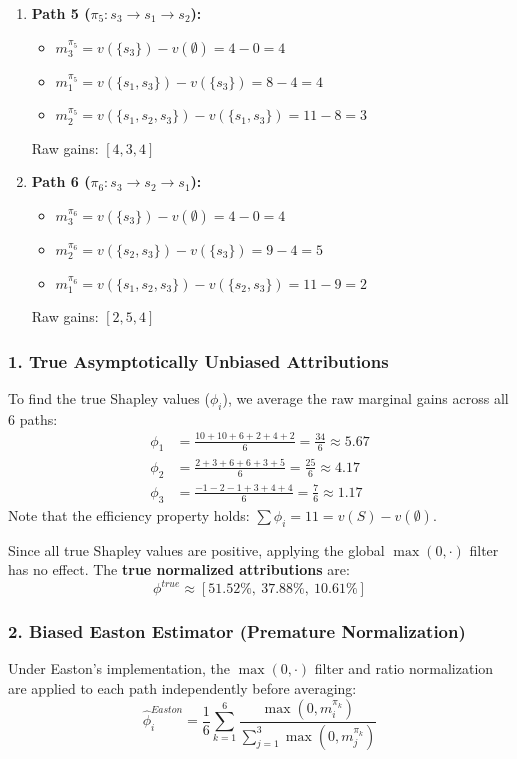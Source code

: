 \documentclass{article}
\begin{document}
\begin{enumerate}
    \item \textbf{Path 5 ($\pi_5: s_3 \to s_1 \to s_2$):} 
    \begin{itemize}
        \item $m_3^{\pi_5} = v(\{s_3\}) - v(\emptyset) = 4 - 0 = 4$
        \item $m_1^{\pi_5} = v(\{s_1, s_3\}) - v(\{s_3\}) = 8 - 4 = 4$
        \item $m_2^{\pi_5} = v(\{s_1, s_2, s_3\}) - v(\{s_1, s_3\}) = 11 - 8 = 3$
    \end{itemize}
    Raw gains: $[4, 3, 4]$

    \item \textbf{Path 6 ($\pi_6: s_3 \to s_2 \to s_1$):} 
    \begin{itemize}
        \item $m_3^{\pi_6} = v(\{s_3\}) - v(\emptyset) = 4 - 0 = 4$
        \item $m_2^{\pi_6} = v(\{s_2, s_3\}) - v(\{s_3\}) = 9 - 4 = 5$
        \item $m_1^{\pi_6} = v(\{s_1, s_2, s_3\}) - v(\{s_2, s_3\}) = 11 - 9 = 2$
    \end{itemize}
    Raw gains: $[2, 5, 4]$
\end{enumerate}

\subsubsection{1. True Asymptotically Unbiased Attributions}
To find the true Shapley values ($\phi_i$), we average the raw marginal gains across all $6$ paths:
\begin{align*}
    \phi_1 &= \frac{10 + 10 + 6 + 2 + 4 + 2}{6} = \frac{34}{6} \approx 5.67 \\
    \phi_2 &= \frac{2 + 3 + 6 + 6 + 3 + 5}{6} = \frac{25}{6} \approx 4.17 \\
    \phi_3 &= \frac{-1 - 2 - 1 + 3 + 4 + 4}{6} = \frac{7}{6} \approx 1.17
\end{align*}
Note that the efficiency property holds: $\sum \phi_i = 11 = v(S) - v(\emptyset)$. 

Since all true Shapley values are positive, applying the global $\max(0, \cdot)$ filter has no effect. The \textbf{true normalized attributions} are:
$$ \phi^{true} \approx [51.52\%, \ 37.88\%, \ 10.61\%] $$

\subsubsection{2. Biased Easton Estimator (Premature Normalization)}
Under Easton's implementation, the $\max(0, \cdot)$ filter and ratio normalization are applied to each path independently before averaging:
$$ \hat{\phi}_i^{Easton} = \frac{1}{6} \sum_{k=1}^6 \frac{\max(0, m_i^{\pi_k})}{\sum_{j=1}^3 \max(0, m_j^{\pi_k})} $$
\end{document}
